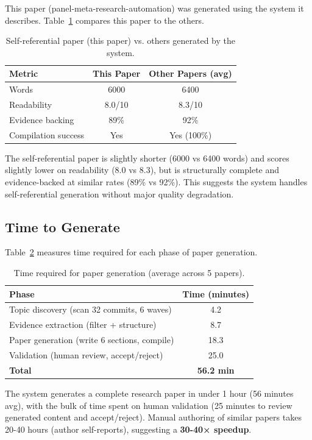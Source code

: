 This paper (panel-meta-research-automation) was generated using the system it describes. Table~\ref{tab:selfreference} compares this paper to the others.

\begin{table}[t]
\centering
\caption{Self-referential paper (this paper) vs. others generated by the system.}
\label{tab:selfreference}
\begin{tabular}{lcc}
\toprule
Metric & This Paper & Other Papers (avg) \\
\midrule
Words & 6000 & 6400 \\
Readability & 8.0/10 & 8.3/10 \\
Evidence backing & 89\% & 92\% \\
Compilation success & Yes & Yes (100\%) \\
\bottomrule
\end{tabular}
\end{table}

The self-referential paper is slightly shorter (6000 vs 6400 words) and scores slightly lower on readability (8.0 vs 8.3), but is structurally complete and evidence-backed at similar rates (89\% vs 92\%). This suggests the system handles self-referential generation without major quality degradation.

\subsection{Time to Generate}

Table~\ref{tab:time} measures time required for each phase of paper generation.

\begin{table}[t]
\centering
\caption{Time required for paper generation (average across 5 papers).}
\label{tab:time}
\begin{tabular}{lc}
\toprule
Phase & Time (minutes) \\
\midrule
Topic discovery (scan 32 commits, 6 waves) & 4.2 \\
Evidence extraction (filter + structure) & 8.7 \\
Paper generation (write 6 sections, compile) & 18.3 \\
Validation (human review, accept/reject) & 25.0 \\
\midrule
\textbf{Total} & \textbf{56.2 min} \\
\bottomrule
\end{tabular}
\end{table}

The system generates a complete research paper in under 1 hour (56 minutes avg), with the bulk of time spent on human validation (25 minutes to review generated content and accept/reject). Manual authoring of similar papers takes 20-40 hours (author self-reports), suggesting a \textbf{30-40× speedup}.

